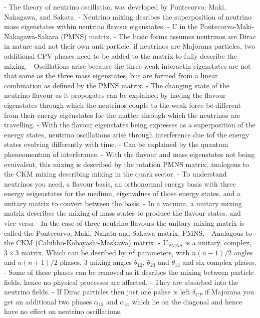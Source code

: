 - The theory of neutrino oscillation was developed by Pontecorvo, Maki, Nakagawa, and Sakata.
- Neutrino mixing desribes the superposition of neutrino mass eigenstates within neutrino flavour
eigenstates.
- U in the Pontecorvo-Maki-Nakagawa-Sakara (PMNS) matrix.
- The basic forms assumes neutrinos are Dirac in nature and not their own anti-particle. if
neutrinos are Majorana particles, two additional CPV phases need to be added to the matrix to
fully describe the mixing.
- Oscillations arise because the three weak interactin eigenstates are not that same as the three
mass eigenstates, but are formed from a linear combination as defined by the PMNS matrix.
- The changing state of the neutrino flavour as it propogates can be explained by having the
flavour eigenstates through which the neutrinos
couple to the weak force be different from their energy eigenstates for the matter through which
the neutrinos are travelling.
- With the flavour eigenstates being expresses as a superposition of the energy states, neutrino
oscillations arise through interference due tof
the energy states evolving differently with time.
- Can be explained by the quantum pheneomentum of interferance.
- With the flavour and mass eigenstates not being evuivalent, this mixing is described by the
rotation PMNS matrix, analogous to the CKM mixing describing mixing in the quark sector.
- To understand neutrinos you need, a flavour basis, an orthonormal energy basis with three energy
esigenstates for the medium, eigenvalues of those energy states,
and a unitary matrix to convert between the basis.
- In a vacuum, a unitary mixing matrix describes the mixing of mass states to produce the flavour
states. and vice-versa
- In the case of three neutrino flavours the unitary mixing matrix is called the Pontecorvo, Maki,
Nakata and Sakawa matrix, PMNS.
- Analagous to the CKM (Cabibbo-Kobayashi-Maskawa) matrix.
- $\mathrm{U}_{\mathrm{PMNS}}$ is a unitary, complex, $3\times3$ matrix. Which can be desribed by
$n^{2}$ parameters, with $n(n-1)/2$ angles
and $n(n+1)/2$ phases, 3 mixing angles $\theta_{12}$, $\theta_{23}$ and $\theta_{13}$ and six
complex phases.
- Some of these phases can be removed as it desribes the mixing between particle fields, hence no
physical processes are affected.
- They are absorbed into the neutrino fields.
- If Dirac particles then just one pahse is left $\delta_{CP}$ if Majorana you get an additional
two phases $\alpha_{12}$ and $\alpha_{31}$ which lie on the diagonal and hence have no effect on
neutrino oscillations.

